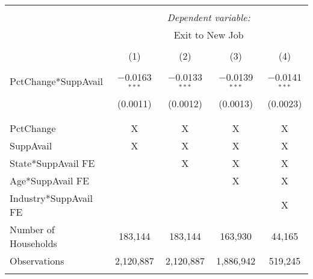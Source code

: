 
\begin{tabular}{@{\extracolsep{5pt}}lcccc} 
\\[-1.8ex]\toprule 
\toprule \\[-1.8ex] 
 & \multicolumn{4}{c}{\textit{Dependent variable:}} \\ 
\cmidrule{2-5} 
 & \multicolumn{4}{c}{Exit to New Job} \\ 
\\[-1.8ex] & (1) & (2) & (3) & (4)\\ 
\midrule \\[-1.8ex] 
 PctChange*SuppAvail & $-$0.0163$^{***}$ & $-$0.0133$^{***}$ & $-$0.0139$^{***}$ & $-$0.0141$^{***}$ \\ 
  & (0.0011) & (0.0012) & (0.0013) & (0.0023) \\ 
  & & & & \\ 
\midrule \\[-1.8ex] 
PctChange & X & X & X & X \\ 
SuppAvail & X & X & X & X \\ 
State*SuppAvail FE &   & X & X & X \\ 
Age*SuppAvail FE &   &   & X & X \\ 
Industry*SuppAvail FE &   &   &   & X \\ 
Number of Households & 183,144 & 183,144 & 163,930 & 44,165 \\ 
Observations & 2,120,887 & 2,120,887 & 1,886,942 & 519,245 \\ 
\bottomrule \\[-1.8ex] 
\end{tabular} 
